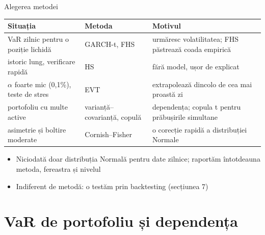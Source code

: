 \begin{frame}{Alegerea metodei}
\itemsize{\footnotesize}
\begin{center}
\footnotesize
\begin{tabular}{>{\raggedright\arraybackslash}p{3.6cm}>{\raggedright\arraybackslash}p{3.3cm}>{\raggedright\arraybackslash}p{4.0cm}}
\toprule
\textbf{Situația} & \textbf{Metoda} & \textbf{Motivul} \\
\midrule
VaR zilnic pentru o poziție lichidă & GARCH-t, FHS & urmăresc volatilitatea; FHS păstrează coada empirică \\
istoric lung, verificare rapidă & HS & fără model, ușor de explicat \\
$\alpha$ foarte mic (0,1\%), teste de stres & EVT & extrapolează dincolo de cea mai proastă zi \\
portofoliu cu multe active & varianță--covarianță, copulă & dependența; copula t pentru prăbușirile simultane \\
asimetrie și boltire moderate & Cornish--Fisher & o corecție rapidă a distribuției Normale \\
\bottomrule
\end{tabular}
\end{center}
\begin{itemize}
    \item Niciodată doar distribuția Normală pentru date zilnice; raportăm întotdeauna metoda, fereastra și nivelul
    \item Indiferent de metodă: o testăm prin backtesting (secțiunea 7)
\end{itemize}
\end{frame}


\section{VaR de portofoliu și dependența}


